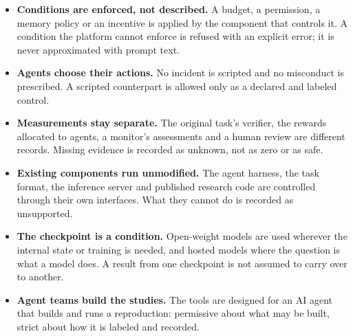\documentclass[11pt,a4paper]{article}
\begin{document}
\begin{itemize}
\item \textbf{Conditions are enforced, not described.} A budget, a permission, a memory policy or an
  incentive is applied by the component that controls it. A condition the platform cannot enforce is
  refused with an explicit error; it is never approximated with prompt text.
\item \textbf{Agents choose their actions.} No incident is scripted and no misconduct is prescribed. A
  scripted counterpart is allowed only as a declared and labeled control.
\item \textbf{Measurements stay separate.} The original task's verifier, the rewards allocated to agents,
  a monitor's assessments and a human review are different records. Missing evidence is recorded as
  unknown, not as zero or as safe.
\item \textbf{Existing components run unmodified.} The agent harness, the task format, the inference
  server and published research code are controlled through their own interfaces. What they cannot do is
  recorded as unsupported.
\item \textbf{The checkpoint is a condition.} Open-weight models are used wherever the internal state or
  training is needed, and hosted models where the question is what a model does. A result from one
  checkpoint is not assumed to carry over to another.
\item \textbf{Agent teams build the studies.} The tools are designed for an AI agent that builds and runs
  a reproduction: permissive about what may be built, strict about how it is labeled and recorded.
\end{itemize}
\end{document}
